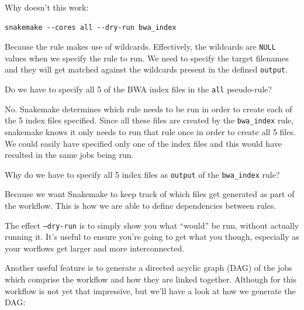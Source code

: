 \begin{questions}

Why doesn't this work:

\begin{lstlisting}
snakemake --cores all --dry-run bwa_index
\end{lstlisting}

\begin{answer}

Because the rule makes use of wildcards.
Effectively, the wildcards are \texttt{NULL} values when we specify the rule to run. We need to specify the target filenames and they will get matched against the wildcards present in the defined \texttt{output}.

\end{answer}

Do we have to specify all 5 of the BWA index files in the \texttt{all} pseudo-rule?

\begin{answer}

No.
Snakemake determines which rule needs to be run in order to create each of the 5 index files specified.
Since all these files are created by the \texttt{bwa\_index} rule, snakemake knows it only needs to run that rule once in order to create all 5 files.
We could easily have specified only one of the index files and this would have resulted in the same jobs being run.

\end{answer}

Why do we have to specify all 5 index files as \texttt{output} of the \texttt{bwa\_index} rule?

\begin{answer}

Because we want Snakemake to keep track of which files get generated as part of the workflow.
This is how we are able to define dependencies between rules.

\end{answer}

\end{questions}


The effect \texttt{--dry-run} is to simply show you what ``would'' be run, without actually running it.
It's useful to ensure you're going to get what you though, especially as your worflows get larger and more interconnected.

Another useful feature is to generate a directed acyclic graph (DAG) of the jobs which comprise the workflow and how they are linked together.
Although for this workflow is not yet that impressive, but we'll have a look at how we generate the DAG:

